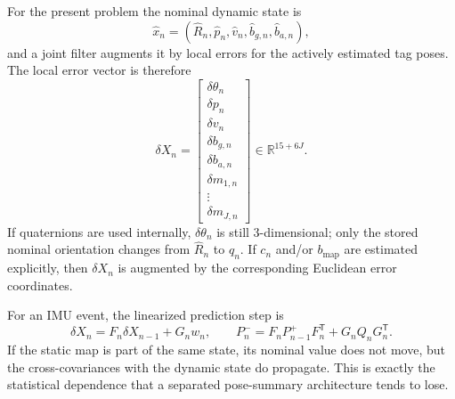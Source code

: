 \documentclass[11pt]{report}
\newcommand{\R}{\mathbb{R}}
\newcommand{\tran}{^{\mathsf T}}
\begin{document}
For the present problem the nominal dynamic state is
\[
\hat x_n=(\hat R_n,\hat p_n,\hat v_n,\hat b_{g,n},\hat b_{a,n}),
\]
and a joint filter augments it by local errors for the actively estimated tag poses. The local error vector is therefore
\begin{equation}
\delta X_n=\begin{bmatrix}
\delta\theta_n\\ \delta p_n\\ \delta v_n\\ \delta b_{g,n}\\ \delta b_{a,n}\\ \delta m_{1,n}\\ \vdots\\ \delta m_{J,n}
\end{bmatrix}\in\R^{15+6J}.
\label{eq:error_state_definition_sweep}
\end{equation}
If quaternions are used internally, $\delta\theta_n$ is still 3-dimensional; only the stored nominal orientation changes from $\hat R_n$ to $\hat q_n$. If $c_n$ and/or $b_{\mathrm{map}}$ are estimated explicitly, then $\delta X_n$ is augmented by the corresponding Euclidean error coordinates.

For an IMU event, the linearized prediction step is
\begin{equation}
\delta X_n=F_n\delta X_{n-1}+G_nw_n,
\qquad
P_n^-=F_nP_{n-1}^+F_n\tran+G_nQ_nG_n\tran.
\label{eq:ekf_prediction_sweep}
\end{equation}
If the static map is part of the same state, its nominal value does not move, but the cross-covariances with the dynamic state do propagate. This is exactly the statistical dependence that a separated pose-summary architecture tends to lose.
\end{document}
